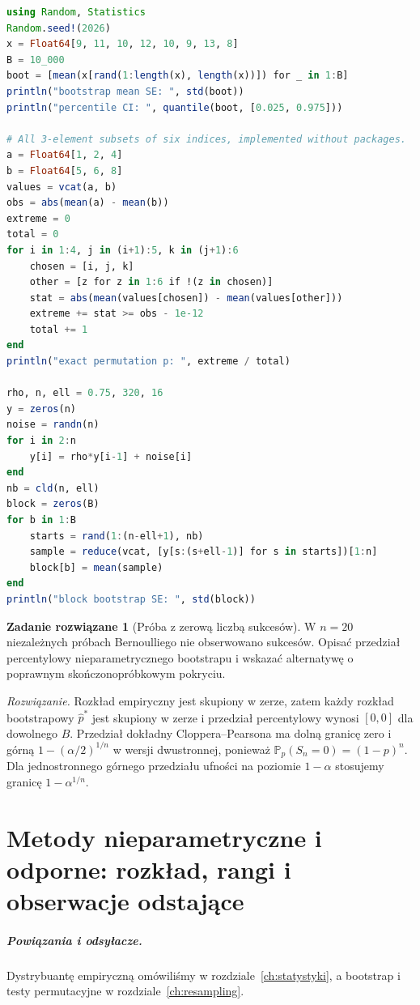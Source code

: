 \documentclass[11pt,a4paper,oneside]{report}
\numberwithin{equation}{chapter}
\theoremstyle{plain}
\theoremstyle{definition}
\newtheorem{zadanie}{Zadanie rozwiązane}[chapter]
\theoremstyle{remark}
\newcommand{\Prob}{\mathbb P}
\begin{document}
\begin{lstlisting}[language=Julia,caption={Kompletny program: bootstrap, dokładny test permutacyjny i resampling bloków (Julia, Random i Statistics).}]
using Random, Statistics
Random.seed!(2026)
x = Float64[9, 11, 10, 12, 10, 9, 13, 8]
B = 10_000
boot = [mean(x[rand(1:length(x), length(x))]) for _ in 1:B]
println("bootstrap mean SE: ", std(boot))
println("percentile CI: ", quantile(boot, [0.025, 0.975]))

# All 3-element subsets of six indices, implemented without packages.
a = Float64[1, 2, 4]
b = Float64[5, 6, 8]
values = vcat(a, b)
obs = abs(mean(a) - mean(b))
extreme = 0
total = 0
for i in 1:4, j in (i+1):5, k in (j+1):6
    chosen = [i, j, k]
    other = [z for z in 1:6 if !(z in chosen)]
    stat = abs(mean(values[chosen]) - mean(values[other]))
    extreme += stat >= obs - 1e-12
    total += 1
end
println("exact permutation p: ", extreme / total)

rho, n, ell = 0.75, 320, 16
y = zeros(n)
noise = randn(n)
for i in 2:n
    y[i] = rho*y[i-1] + noise[i]
end
nb = cld(n, ell)
block = zeros(B)
for b in 1:B
    starts = rand(1:(n-ell+1), nb)
    sample = reduce(vcat, [y[s:(s+ell-1)] for s in starts])[1:n]
    block[b] = mean(sample)
end
println("block bootstrap SE: ", std(block))
\end{lstlisting}

\begin{zadanie}[Próba z zerową liczbą sukcesów]
W $n=20$ niezależnych próbach Bernoulliego nie obserwowano sukcesów.
Opisać przedział percentylowy nieparametrycznego bootstrapu
i wskazać alternatywę o poprawnym skończonopróbkowym pokryciu.
\par\emph{Rozwiązanie.} Rozkład empiryczny jest skupiony w zerze,
zatem każdy rozkład bootstrapowy $\widehat p^*$ jest skupiony
w zerze i przedział percentylowy wynosi $[0,0]$ dla dowolnego $B$.
Przedział dokładny Cloppera--Pearsona ma dolną granicę zero
i górną $1-(\alpha/2)^{1/n}$ w wersji dwustronnej,
ponieważ $\Prob_p(S_n=0)=(1-p)^n$.
Dla jednostronnego górnego przedziału ufności na poziomie
$1-\alpha$ stosujemy granicę $1-\alpha^{1/n}$.
\end{zadanie}


\chapter{Metody nieparametryczne i odporne: rozkład, rangi i obserwacje odstające}
\label{ch:nonparametric}
\paragraph{Powiązania i odsyłacze.} Dystrybuantę empiryczną omówiliśmy w rozdziale~\ref{ch:statystyki}, a bootstrap i testy permutacyjne w rozdziale~\ref{ch:resampling}.
\end{document}
